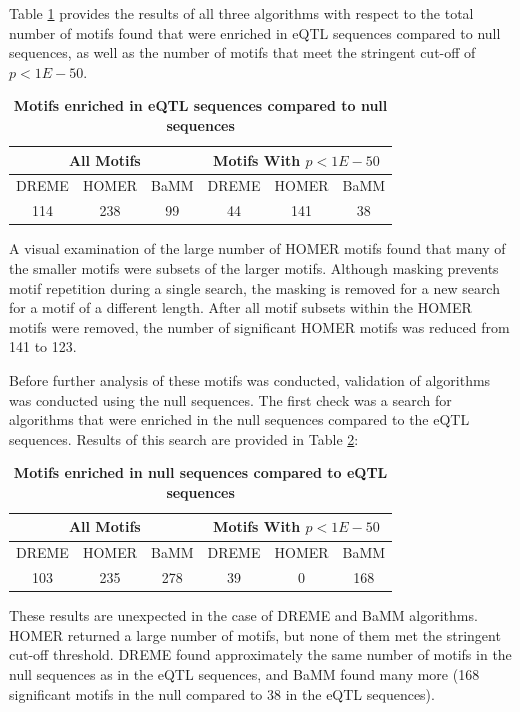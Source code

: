 \documentclass[12pt]{article}
\begin{document}
Table \ref{eQTLmotifNumbers} provides the results of all three algorithms with respect to the total number of motifs found that were enriched in eQTL sequences compared to null sequences, as well as the number of motifs that meet the stringent cut-off of $p<1E-50$.

\begin{table}[!htbp]
\caption{\bf{Motifs enriched in eQTL sequences compared to null sequences}}
\label{eQTLmotifNumbers}
\centering
\begin{tabular}{|c|c|c||c|c|c|}
\hline
\multicolumn{3}{|c||}{All Motifs} & \multicolumn{3}{|c|}{Motifs With $p<1E-50$}\\
\hline
DREME & HOMER & BaMM & DREME & HOMER & BaMM\\
\hline
\hline
114 & 238 & 99 & 44 & 141 & 38\\
\hline
\end{tabular}
\end{table}

A visual examination of the large number of HOMER motifs found that many of the smaller motifs were subsets of the larger motifs. Although masking prevents motif repetition during a single search, the masking is removed for a new search for a motif of a different length. After all motif subsets within the HOMER motifs were removed, the number of significant HOMER motifs was reduced from 141 to 123.

Before further analysis of these motifs was conducted, validation of algorithms was conducted using the null sequences. The first check was a search for algorithms that were enriched in the null sequences compared to the eQTL sequences. Results of this search are provided in Table \ref{nullMotifNumbers}:

\begin{table}[!htbp]
\caption{\bf{Motifs enriched in null sequences compared to eQTL sequences}}
\label{nullMotifNumbers}
\centering
\begin{tabular}{|c|c|c||c|c|c|}
\hline
\multicolumn{3}{|c||}{All Motifs} & \multicolumn{3}{|c|}{Motifs With $p<1E-50$}\\
\hline
DREME & HOMER & BaMM & DREME & HOMER & BaMM\\
\hline
\hline
103 & 235 & 278 & 39 & 0 & 168\\
\hline
\end{tabular}
\end{table}

These results are unexpected in the case of DREME and BaMM algorithms. HOMER returned a large number of motifs, but none of them met the stringent cut-off threshold. DREME found approximately the same number of motifs in the null sequences as in the eQTL sequences, and BaMM found many more (168 significant motifs in the null compared to 38 in the eQTL sequences).
\end{document}
